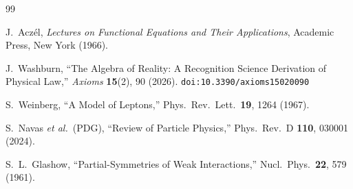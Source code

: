 \documentclass[12pt,a4paper]{article}
\theoremstyle{definition}
\theoremstyle{remark}
\begin{document}
\begin{thebibliography}{99}

J.~Acz\'el, \emph{Lectures on Functional Equations and Their Applications},
Academic Press, New York (1966).

J.~Washburn, ``The Algebra of Reality: A Recognition Science Derivation
of Physical Law,'' \emph{Axioms} \textbf{15}(2), 90 (2026).
\texttt{doi:10.3390/axioms15020090}

S.~Weinberg, ``A Model of Leptons,'' Phys.\ Rev.\ Lett.\
\textbf{19}, 1264 (1967).

S.~Navas \textit{et al.}\ (PDG), ``Review of Particle Physics,''
Phys.\ Rev.\ D \textbf{110}, 030001 (2024).

S.~L.~Glashow, ``Partial-Symmetries of Weak Interactions,''
Nucl.\ Phys.\ \textbf{22}, 579 (1961).

\end{thebibliography}
\end{document}
